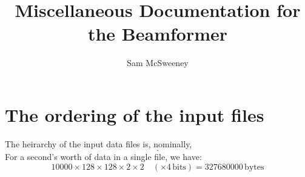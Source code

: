 \documentclass{article}
\author{Sam McSweeney}
\title{Miscellaneous Documentation for the Beamformer}
\begin{document}
\maketitle

\tableofcontents

\section{The ordering of the input files}

The heirarchy of the input data files is, nominally,
\begin{equation}
    [\text{time sample}][\text{channel}][\text{antenna}][\text{polarisation}][\text{complexity}].
\end{equation}
For a second's worth of data in a single file, we have:
\begin{equation}
    10000 \times 128 \times 128 \times 2 \times 2\quad (\times 4\,\text{bits}) = 327680000\,\text{bytes}
\end{equation}
\end{document}
